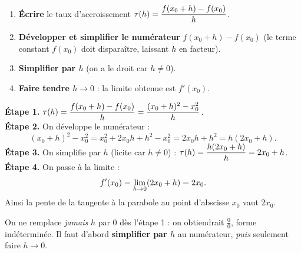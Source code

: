 \begin{methode}
\begin{enumerate}[leftmargin=7mm,itemsep=1pt]
  \item \textbf{Écrire} le taux d'accroissement $\displaystyle\tau(h)=\frac{f(x_0+h)-f(x_0)}{h}$.
  \item \textbf{Développer et simplifier le numérateur} $f(x_0+h)-f(x_0)$ (le terme
        constant $f(x_0)$ doit disparaître, laissant $h$ en facteur).
  \item \textbf{Simplifier par $h$} (on a le droit car $h\neq 0$).
  \item \textbf{Faire tendre $h\to 0$} : la limite obtenue est $f'(x_0)$.
\end{enumerate}
\end{methode}

\begin{exemplebox}[la fonction carré $f(x)=x^2$]
\textbf{Étape 1.} $\displaystyle \tau(h)=\frac{f(x_0+h)-f(x_0)}{h}=\frac{(x_0+h)^2-x_0^2}{h}$.\\[2pt]
\textbf{Étape 2.} On développe le numérateur :
\[
(x_0+h)^2-x_0^2=x_0^2+2x_0h+h^2-x_0^2=2x_0h+h^2=h(2x_0+h).
\]
\textbf{Étape 3.} On simplifie par $h$ (licite car $h\neq0$) :
$\displaystyle \tau(h)=\frac{h(2x_0+h)}{h}=2x_0+h$.\\[2pt]
\textbf{Étape 4.} On passe à la limite :
\[
f'(x_0)=\lim_{h\to 0} (2x_0+h)=2x_0.
\]
Ainsi la pente de la tangente à la parabole au point d'abscisse $x_0$ vaut $2x_0$.
\end{exemplebox}

\begin{piege}
On ne remplace \emph{jamais} $h$ par $0$ dès l'étape 1 : on obtiendrait
$\frac{0}{0}$, forme indéterminée. Il faut d'abord \textbf{simplifier par $h$}
au numérateur, \emph{puis} seulement faire $h\to 0$.
\end{piege}


